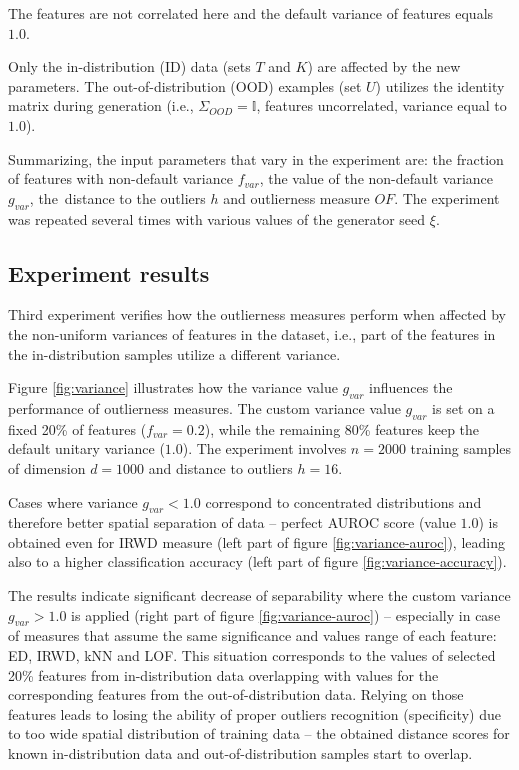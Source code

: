 The features are not correlated here and the default variance of features equals $1.0$.

Only the in-distribution (ID) data (sets $T$ and $K$) are affected by the new parameters. The out-of-distribution (OOD) examples (set $U$) utilizes the identity matrix during generation (i.e., $\Sigma_{OOD} = \mathbb{I}$, features uncorrelated, variance equal to $1.0$).

Summarizing, the input parameters that vary in the experiment are: the fraction of features with non-default variance $f_{var}$, the value of the non-default variance $g_{var}$, the~distance to the outliers $h$ and outlierness measure $OF$. The experiment was repeated several times with various values of the generator seed $\xi$.


\subsection{Experiment results}
\label{section:variances-results}

Third experiment verifies how the outlierness measures perform when affected by the non-uniform variances of features in the dataset, i.e., part of the features in the in-distribution samples utilize a different variance.

Figure \ref{fig:variance} illustrates how the variance value $g_{var}$ influences the performance of outlierness measures. The custom variance value $g_{var}$ is set on a fixed 20\% of features ($f_{var} = 0.2$), while the remaining 80\% features keep the default unitary variance ($1.0$). The experiment involves $n = 2000$ training samples of dimension $d = 1000$ and distance to outliers $h = 16$.

Cases where variance $g_{var} < 1.0$ correspond to concentrated distributions and therefore better spatial separation of data – perfect AUROC score (value $1.0$) is obtained even for IRWD measure (left part of figure \ref{fig:variance-auroc}), leading also to a higher classification accuracy (left part of figure \ref{fig:variance-accuracy}).

The results indicate significant decrease of separability where the custom variance $g_{var} > 1.0$ is applied (right part of figure \ref{fig:variance-auroc}) – especially in case of measures that assume the same significance and values range of each feature: ED, IRWD, kNN and LOF. This situation corresponds to the values of selected 20\% features from in-distribution data overlapping with values for the corresponding features from the out-of-distribution data. Relying on those features leads to losing the ability of proper outliers recognition (specificity) due to too wide spatial distribution of training data – the obtained distance scores for known in-distribution data and out-of-distribution samples start to overlap.

